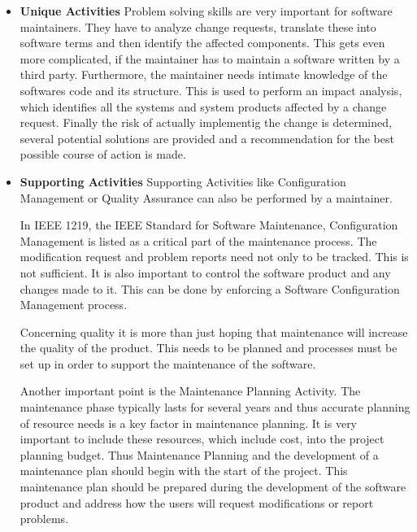 \begin{itemize}
    \item \textbf{Unique Activities}\newline
    Problem solving skills are very important for software maintainers. They have to analyze change requests, translate these into software terms and then identify the affected components. This gets even more complicated, if the maintainer has to maintain a software written by a third party. Furthermore, the maintainer needs intimate knowledge of the softwares code and its structure. This is used to perform an impact analysis, which identifies all the systems and system products affected by a change request. Finally the risk of actually implementig the change is determined, several potential solutions are provided and a recommendation for the best possible course of action is made.\citep{pigoski_software_2015} 
    
    \item \textbf{Supporting Activities} \newline
    Supporting Activities like Configuration Management or Quality Assurance can also be performed by a maintainer.\citep{pigoski_software_2015}
    
    In IEEE 1219, the IEEE Standard for Software Maintenance, Configuration Management is listed as a critical part of the maintenance process. The modification request and problem reports need not only to be tracked. This is not sufficient. It is also important to control the software product and any changes made to it. This can be done by enforcing a Software Configuration Management process. \citep{pigoski_software_2015}
    
    Concerning quality it is more than just hoping that maintenance will increase the quality of the product. This needs to be planned and processes must be set up in order to support the maintenance of the software. \citep{pigoski_software_2015}
    
    Another important point is the Maintenance Planning Activity. The maintenance phase typically lasts for several years and thus accurate planning of resource needs is a key factor in maintenance planning. It is very important to include these resources, which include cost, into the project planning budget. Thus Maintenance Planning and the development of a maintenance plan should begin with the start of the project. This maintenance plan should be prepared during the development of the software product and address how the users will request modifications or report problems. \citep{pigoski_software_2015}
\end{itemize}

